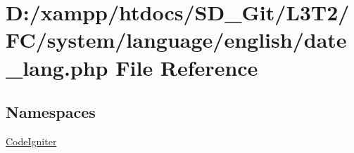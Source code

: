 \hypertarget{system_2language_2english_2date__lang_8php}{}\section{D\+:/xampp/htdocs/\+S\+D\+\_\+\+Git/\+L3\+T2/\+F\+C/system/language/english/date\+\_\+lang.php File Reference}
\label{system_2language_2english_2date__lang_8php}
\subsection*{Namespaces}
\begin{DoxyCompactItemize}
\item 
 \hyperlink{namespace_code_igniter}{Code\+Igniter}
\end{DoxyCompactItemize}
